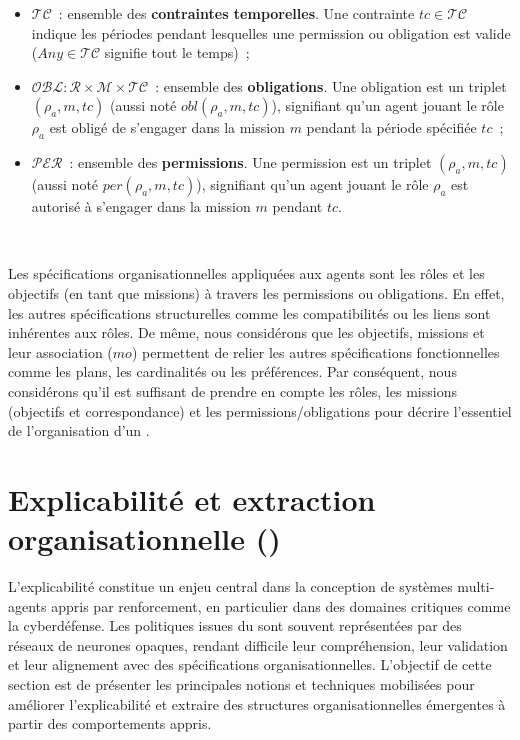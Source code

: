 \begin{itemize}
  \item $\mathcal{TC}$~: ensemble des \textbf{contraintes temporelles}. Une contrainte $tc \in \mathcal{TC}$ indique les périodes pendant lesquelles une permission ou obligation est valide ($Any \in \mathcal{TC}$ signifie tout le temps)~;
  \item $\mathcal{OBL}: \mathcal{R} \times \mathcal{M} \times \mathcal{TC}$~: ensemble des \textbf{obligations}. Une obligation est un triplet $(\rho_a, m, tc)$ (aussi noté $obl(\rho_a, m, tc)$), signifiant qu'un agent jouant le rôle $\rho_a$ est obligé de s'engager dans la mission $m$ pendant la période spécifiée $tc$~;
  \item $\mathcal{PER}$~: ensemble des \textbf{permissions}. Une permission est un triplet $(\rho_a, m, tc)$ (aussi noté $per(\rho_a, m, tc)$), signifiant qu'un agent jouant le rôle $\rho_a$ est autorisé à s'engager dans la mission $m$ pendant $tc$.
\end{itemize}

\

\noindent Les spécifications organisationnelles appliquées aux agents sont les rôles et les objectifs (en tant que missions) à travers les permissions ou obligations. En effet, les autres spécifications structurelles comme les compatibilités ou les liens sont inhérentes aux rôles. De même, nous considérons que les objectifs, missions et leur association ($mo$) permettent de relier les autres spécifications fonctionnelles comme les plans, les cardinalités ou les préférences.
Par conséquent, nous considérons qu'il est suffisant de prendre en compte les rôles, les missions (objectifs et correspondance) et les permissions/obligations pour décrire l'essentiel de l'organisation d'un .


\section{Explicabilité et extraction organisationnelle ()}

\noindent
L’explicabilité constitue un enjeu central dans la conception de systèmes multi-agents
appris par renforcement, en particulier dans des domaines critiques comme la cyberdéfense.
Les politiques issues du  sont souvent représentées par des réseaux de neurones
opaques, rendant difficile leur compréhension, leur validation et leur alignement
avec des spécifications organisationnelles.
L’objectif de cette section est de présenter les principales notions et techniques
mobilisées pour améliorer l’explicabilité et extraire des structures organisationnelles
émergentes à partir des comportements appris.


